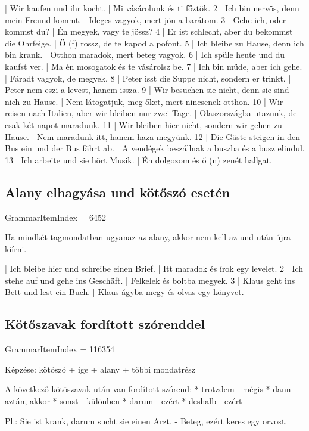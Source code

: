 \documentclass{article}
\newenvironment{desc}{\verbatim}{\endverbatim}
\newenvironment{exmp}{\verbatim}{\endverbatim}
\begin{document}
\begin{exmp}
1 | Wir kaufen und ihr kocht. | Mi vásárolunk és ti főztök.
2 | Ich bin nervös, denn mein Freund kommt. | Ideges vagyok, mert jön a barátom.
3 | Gehe ich, oder kommst du? | Én megyek, vagy te jössz?
4 | Er ist schlecht, aber du bekommst die Ohrfeige. | Ö (f) rossz, de te kapod a pofont.
5 | Ich bleibe zu Hause, denn ich bin krank. | Otthon maradok, mert beteg vagyok.
6 | Ich spüle heute und du kaufst ver. | Ma én mosogatok és te vásárolsz be.
7 | Ich bin müde, aber ich gehe. | Fáradt vagyok, de megyek.
8 | Peter isst die Suppe nicht, sondern er trinkt. | Peter nem eszi a levest, hanem issza.
9 | Wir besuchen sie nicht, denn sie sind nich zu Hause. | Nem látogatjuk, meg őket, mert nincsenek otthon.
10 | Wir reisen nach Italien, aber wir bleiben nur zwei Tage. | Olaszországba utazunk, de csak két napot maradunk.
11 | Wir bleiben hier nicht, sondern wir gehen zu Hause. | Nem maradunk itt, hanem haza megyünk.
12 | Die Gäste steigen in den Bus ein und der Bus fährt ab. | A vendégek beszállnak a buszba és a busz elindul.
13 | Ich arbeite und sie hört Musik. | Én dolgozom és ő (n) zenét hallgat.
\end{exmp}

\subsection{Alany elhagyása und kötőszó esetén}

GrammarItemIndex = 6452

\begin{desc}
Ha mindkét tagmondatban ugyanaz az alany, akkor nem kell az und után újra kiírni.
\end{desc}

\begin{exmp}
1 | Ich bleibe hier und schreibe einen Brief. | Itt maradok és írok egy levelet.
2 | Ich stehe auf und gehe ins Geschäft. | Felkelek és boltba megyek.
3 | Klaus geht ins Bett und lest ein Buch. | Klaus ágyba megy és olvas egy könyvet.
\end{exmp}

\subsection{Kötőszavak fordított szórenddel}

GrammarItemIndex = 116354

\begin{desc}
Képzése: kötőszó + ige + alany + többi mondatrész

A következő kötöszavak után van fordított szórend:
* trotzdem - mégis
* dann - aztán, akkor
* sonst - különben
* darum - ezért
* deshalb - ezért

Pl.: Sie ist krank, darum sucht sie einen Arzt. - Beteg, ezért keres egy orvost.
\end{desc}
\end{document}
